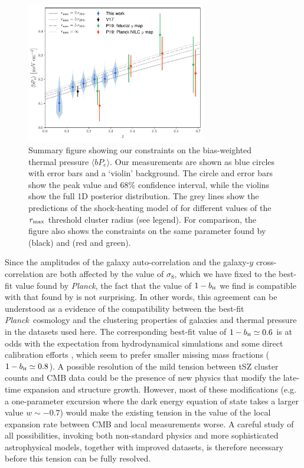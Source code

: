 \documentclass[useAMS,usenatbib]{mn2e}
\def\bH{b_{\scriptscriptstyle\rm H}}
\def\planck{{\it Planck\/}}
\begin{document}
      \begin{figure}
        \centering
        \includegraphics[width=0.7\textwidth]{by.pdf}
        \caption{Summary figure showing our constraints on the bias-weighted thermal pressure $\langle bP_e\rangle$. Our measurements are shown as blue circles with error bars and a `violin' background. The circle and error bars show the peak value and 68\% confidence interval, while the violins show the full 1D posterior distribution. The grey lines show the predictions of the shock-heating model of \citet{2012ApJ...758...75B} for different values of the $r_{\rm max}$ threshold cluster radius (see legend). For comparison, the figure also shows the constraints on the same parameter found by \citet{2017MNRAS.467.2315V} (black) and \citet{2019arXiv190413347P} (red and green).}
        \label{fig:by}
      \end{figure}
      
      Since the amplitudes of the galaxy auto-correlation and the galaxy-$y$ cross-correlation are both affected by the value of $\sigma_8$, which we have fixed to the best-fit value found by \planck, the fact that the value of $1-\bH$ we find is compatible with that found by \cite{2016A&A...594A..24P} is not surprising. In other words, this agreement can be understood as a evidence of the compatibility between the best-fit \planck\ cosmology and the clustering properties of galaxies and thermal pressure in the datasets used here. The corresponding best-fit value of $1-\bH\simeq0.6$ is at odds with the expectation from hydrodynamical simulations \citep{2016ApJ...827..112B} and some direct calibration efforts \citep[e.g.][]{2016MNRAS.456L..74S,2019A&A...621A..40E}, which seem to prefer smaller missing mass fractions ($1-\bH\simeq0.8$). A possible resolution of the mild tension between tSZ cluster counts and CMB data could be the presence of new physics that modify the late-time expansion and structure growth. However, most of these modifications (e.g. a one-parameter excursion where the dark energy equation of state takes a larger value $w\sim-0.7$) would make the existing tension in the value of the local expansion rate between CMB and local measurements \citep{2019ApJ...876...85R} worse. A careful study of all possibilities, invoking both non-standard physics and more sophisticated astrophysical models, together with improved datasets, is therefore necessary before this tension can be fully resolved.
\end{document}
